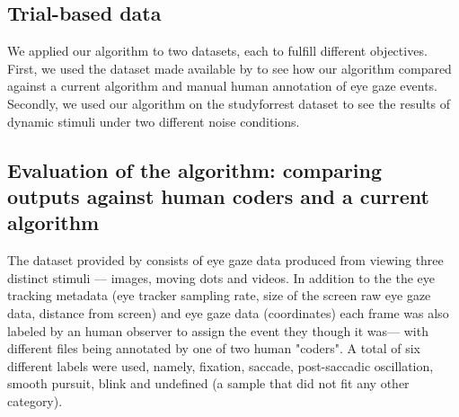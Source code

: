 
\subsection*{Trial-based data}



We applied our algorithm to two datasets, each to fulfill different objectives. First, we used the dataset made available by \citet{Andersson2017} to see how our algorithm compared against a current algorithm and manual human annotation of eye gaze events. Secondly, we used our algorithm on the studyforrest dataset \citep{Hanke2016} to see the results of dynamic stimuli under two different noise conditions.

\subsection*{Evaluation of the algorithm: comparing outputs against human coders and a current algorithm}

The dataset provided by \citet{Andersson2017} consists of eye gaze data produced from viewing three distinct stimuli --- images, moving dots and videos. In addition to the the eye tracking metadata (eye tracker sampling rate, size of the screen raw eye gaze data, distance from screen) and eye gaze data (coordinates) each frame was also labeled by an human observer to assign the event they though it was--- with different files being annotated by one of two human "coders". A total of six different labels were used, namely, fixation, saccade, post-saccadic oscillation, smooth pursuit, blink and undefined (a sample that did not fit any other category). \\

